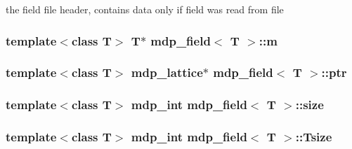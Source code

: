 the field file header, contains data only if field was read from file \hypertarget{classmdp__field_a4d38ed40feef11c07d751fc276a498fc}{
\subsubsection[{m}]{\setlength{\rightskip}{0pt plus 5cm}template$<$class T$>$ T$\ast$ {\bf mdp\_\-field}$<$ T $>$::{\bf m}}}
\label{classmdp__field_a4d38ed40feef11c07d751fc276a498fc}
\hypertarget{classmdp__field_aa3e7e522a6e3c47da7ff7075d71f6417}{
\subsubsection[{ptr}]{\setlength{\rightskip}{0pt plus 5cm}template$<$class T$>$ {\bf mdp\_\-lattice}$\ast$ {\bf mdp\_\-field}$<$ T $>$::{\bf ptr}}}
\label{classmdp__field_aa3e7e522a6e3c47da7ff7075d71f6417}
\hypertarget{classmdp__field_a3dfa0ff545bed811ad055e46020bed7f}{
\subsubsection[{size}]{\setlength{\rightskip}{0pt plus 5cm}template$<$class T$>$ {\bf mdp\_\-int} {\bf mdp\_\-field}$<$ T $>$::{\bf size}}}
\label{classmdp__field_a3dfa0ff545bed811ad055e46020bed7f}
\hypertarget{classmdp__field_aece7eeb6754c5e2ec9f031e352eb6f1f}{
\subsubsection[{Tsize}]{\setlength{\rightskip}{0pt plus 5cm}template$<$class T$>$ {\bf mdp\_\-int} {\bf mdp\_\-field}$<$ T $>$::{\bf Tsize}}}
\label{classmdp__field_aece7eeb6754c5e2ec9f031e352eb6f1f}


